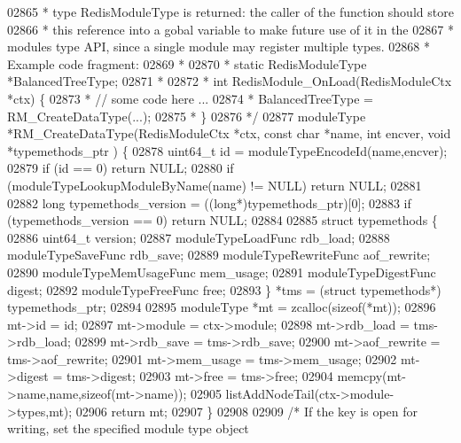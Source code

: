 \begin{DoxyCode}
{{{02865 \textcolor{comment}{ * type RedisModuleType is returned: the caller of the function should store}
02866 \textcolor{comment}{ * this reference into a gobal variable to make future use of it in the}
02867 \textcolor{comment}{ * modules type API, since a single module may register multiple types.}
02868 \textcolor{comment}{ * Example code fragment:}
02869 \textcolor{comment}{ *}
02870 \textcolor{comment}{ *      static RedisModuleType *BalancedTreeType;}
02871 \textcolor{comment}{ *}
02872 \textcolor{comment}{ *      int RedisModule\_OnLoad(RedisModuleCtx *ctx) \{}
02873 \textcolor{comment}{ *          // some code here ...}
02874 \textcolor{comment}{ *          BalancedTreeType = RM\_CreateDataType(...);}
02875 \textcolor{comment}{ *      \}}
02876 \textcolor{comment}{ */}
02877 moduleType *RM\_CreateDataType(RedisModuleCtx *ctx, \textcolor{keyword}{const} \textcolor{keywordtype}{char} *name, \textcolor{keywordtype}{int} encver, \textcolor{keywordtype}{void} *typemethods\_ptr
      ) \{
02878     uint64\_t id = moduleTypeEncodeId(name,encver);
02879     \textcolor{keywordflow}{if} (id == 0) \textcolor{keywordflow}{return} NULL;
02880     \textcolor{keywordflow}{if} (moduleTypeLookupModuleByName(name) != NULL) \textcolor{keywordflow}{return} NULL;
02881 
02882     \textcolor{keywordtype}{long} typemethods\_version = ((\textcolor{keywordtype}{long}*)typemethods\_ptr)[0];
02883     \textcolor{keywordflow}{if} (typemethods\_version == 0) \textcolor{keywordflow}{return} NULL;
02884 
02885     \textcolor{keyword}{struct} typemethods \{
02886         uint64\_t version;
02887         moduleTypeLoadFunc rdb\_load;
02888         moduleTypeSaveFunc rdb\_save;
02889         moduleTypeRewriteFunc aof\_rewrite;
02890         moduleTypeMemUsageFunc mem\_usage;
02891         moduleTypeDigestFunc digest;
02892         moduleTypeFreeFunc free;
02893     \} *tms = (\textcolor{keyword}{struct} typemethods*) typemethods\_ptr;
02894 
02895     moduleType *mt = zcalloc(\textcolor{keyword}{sizeof}(*mt));
02896     mt->id = id;
02897     mt->module = ctx->module;
02898     mt->rdb\_load = tms->rdb\_load;
02899     mt->rdb\_save = tms->rdb\_save;
02900     mt->aof\_rewrite = tms->aof\_rewrite;
02901     mt->mem\_usage = tms->mem\_usage;
02902     mt->digest = tms->digest;
02903     mt->free = tms->free;
02904     memcpy(mt->name,name,\textcolor{keyword}{sizeof}(mt->name));
02905     listAddNodeTail(ctx->module->types,mt);
02906     \textcolor{keywordflow}{return} mt;
02907 \}
02908 
02909 \textcolor{comment}{/* If the key is open for writing, set the specified module type object}
}}}
\end{DoxyCode}
